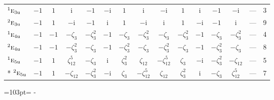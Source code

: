 \documentclass[10pt,a4paper]{article}
\newcommand{\needspace}[1]{\par\penalty-100\begingroup\dimen0=#1\relax\dimen2=\pagegoal
  \advance\dimen2-\pagetotal\ifdim\dimen0>\dimen2\relax\ifdim\dimen2>0pt\vfil\break\fi\fi
  \endgroup}
\numberwithin{equation}{section}
\newcommand{\irr}[1]{\text{\normalfont\scshape #1}}
\newcommand{\conjpair}[1]{{}^{#1}}
\newcommand{\ptag}[1]{\mathrm{#1}}
\newcommand{\iunit}{\mathrm{i}}
\newcommand{\rootunity}[1]{\zeta_{#1}}
\begin{document}
{\begin{longtable}{@{}lccccccccccccll@{}}
$\conjpair{1}\irr{e}_{3\ptag{u}}$ & $-1$ & $1$ & $\iunit{}$ & $-1$ & $-\iunit{}$ & $1$ & $\iunit{}$ & $-\iunit{}$ & $1$ & $\iunit{}$ & $-1$ & $-\iunit{}$ & --- & 3\\
$\conjpair{2}\irr{e}_{3\ptag{u}}$ & $-1$ & $1$ & $-\iunit{}$ & $-1$ & $\iunit{}$ & $1$ & $-\iunit{}$ & $\iunit{}$ & $1$ & $-\iunit{}$ & $-1$ & $\iunit{}$ & --- & 9\\
$\conjpair{1}\irr{e}_{4\ptag{u}}$ & $-1$ & $-1$ & $-\rootunity{3}$ & $-\rootunity{3}^{2}$ & $-1$ & $-\rootunity{3}$ & $-\rootunity{3}^{2}$ & $-\rootunity{3}$ & $-\rootunity{3}^{2}$ & $-1$ & $-\rootunity{3}$ & $-\rootunity{3}^{2}$ & --- & 4\\
$\conjpair{2}\irr{e}_{4\ptag{u}}$ & $-1$ & $-1$ & $-\rootunity{3}^{2}$ & $-\rootunity{3}$ & $-1$ & $-\rootunity{3}^{2}$ & $-\rootunity{3}$ & $-\rootunity{3}^{2}$ & $-\rootunity{3}$ & $-1$ & $-\rootunity{3}^{2}$ & $-\rootunity{3}$ & --- & 8\\
$\conjpair{1}\irr{e}_{5\ptag{u}}$ & $-1$ & $1$ & $\rootunity{12}^{5}$ & $-\rootunity{3}$ & $\iunit{}$ & $\rootunity{3}^{2}$ & $\rootunity{12}$ & $-\rootunity{12}^{5}$ & $\rootunity{3}$ & $-\iunit{}$ & $-\rootunity{3}^{2}$ & $-\rootunity{12}$ & --- & 5\\*
$\conjpair{2}\irr{e}_{5\ptag{u}}$ & $-1$ & $1$ & $-\rootunity{12}$ & $-\rootunity{3}^{2}$ & $-\iunit{}$ & $\rootunity{3}$ & $-\rootunity{12}^{5}$ & $\rootunity{12}$ & $\rootunity{3}^{2}$ & $\iunit{}$ & $-\rootunity{3}$ & $\rootunity{12}^{5}$ & --- & 7\\
\bottomrule\end{longtable}}
\needspace{103pt}
\end{document}

